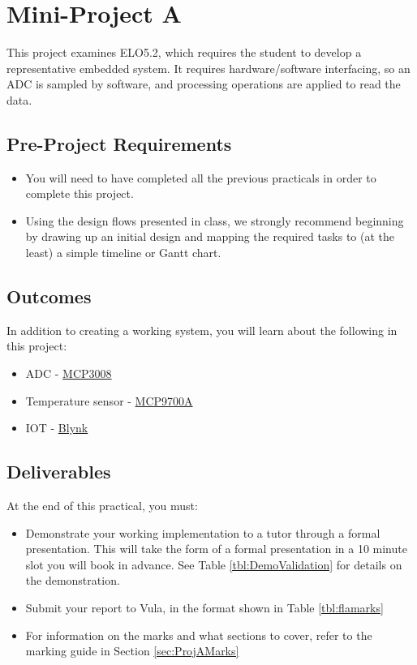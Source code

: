 \section{Mini-Project A}
\label{sec:ProjA}
This project examines ELO5.2, which requires the student to develop a representative embedded system. It requires hardware/software interfacing, so an ADC is sampled by software, and processing operations are applied to read the data. 

\subsection{Pre-Project Requirements}
\begin{itemize}
    \item You will need to have completed all the previous practicals in order to complete this project.
    \item Using the design flows presented in class, we strongly recommend beginning by drawing up an initial design and mapping the required tasks to (at the least) a simple timeline or Gantt chart.
\end{itemize}

\subsection{Outcomes}
In addition to creating a working system, you will learn about the following in this project:
\begin{itemize}
    \item ADC - \href{https://cdn-shop.adafruit.com/datasheets/MCP3008.pdf}{MCP3008}
    \item Temperature sensor - \href{http://ww1.microchip.com/downloads/en/devicedoc/20001942g.pdf}{MCP9700A}
    \item IOT - \href{https://blynk.io/}{Blynk}
\end{itemize}

\subsection{Deliverables}
At the end of this practical, you must:
\begin{itemize}
    \item Demonstrate your working implementation to a tutor through a formal presentation. This will take the form of a formal presentation in a 10 minute slot you will book in advance. See Table \ref{tbl:DemoValidation} for details on the demonstration.
    \item Submit your report to Vula, in the format shown in Table \ref{tbl:flamarks}
    \item For information on the marks and what sections to cover, refer to the marking guide in Section \ref{sec:ProjAMarks}
\end{itemize}

